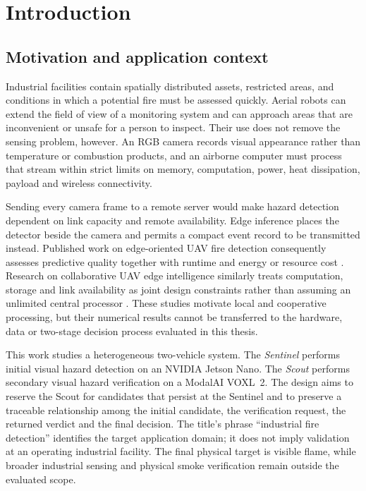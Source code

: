 \chapter{Introduction}
\label{ch:introduction}

\section{Motivation and application context}
\label{sec:introduction:motivation}

Industrial facilities contain spatially distributed assets, restricted areas,
and conditions in which a potential fire must be assessed quickly. Aerial
robots can extend the field of view of a monitoring system and can approach
areas that are inconvenient or unsafe for a person to inspect. Their use does
not remove the sensing problem, however. An RGB camera records visual
appearance rather than temperature or combustion products, and an airborne
computer must process that stream within strict limits on memory, computation,
power, heat dissipation, payload and wireless connectivity.

Sending every camera frame to a remote server would make hazard detection
dependent on link capacity and remote availability. Edge inference places the
detector beside the camera and permits a compact event record to be transmitted
instead. Published work on edge-oriented UAV fire detection consequently
assesses predictive quality together with runtime and energy or resource cost
\cite{Vazquez2026EdgeFire}. Research on collaborative UAV edge intelligence
similarly treats computation, storage and link availability as joint design
constraints rather than assuming an unlimited central processor
\cite{Qu2024ElasticUAV}. These studies motivate local and cooperative
processing, but their numerical results cannot be transferred to the hardware,
data or two-stage decision process evaluated in this thesis.

This work studies a heterogeneous two-vehicle system. The \emph{Sentinel}
performs initial visual hazard detection on an NVIDIA Jetson Nano. The
\emph{Scout} performs secondary visual hazard verification on a ModalAI VOXL~2.
The design aims to reserve the Scout for candidates that persist at the
Sentinel and to preserve a traceable relationship among the initial candidate,
the verification request, the returned verdict and the final decision. The
title's phrase ``industrial fire detection'' identifies the target application
domain; it does not imply validation at an operating industrial facility. The
final physical target is visible flame, while broader industrial sensing and
physical smoke verification remain outside the evaluated scope.

